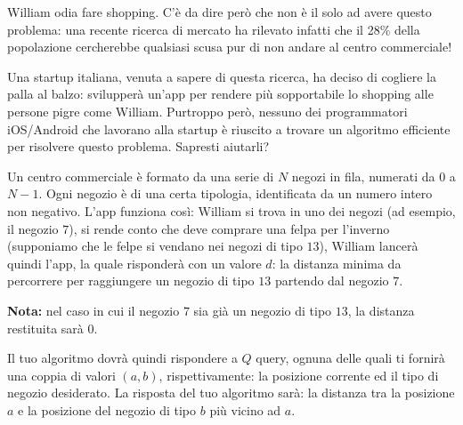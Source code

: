 \usepackage{xcolor}
\usepackage{afterpage}
\usepackage{pifont,mdframed}
\usepackage[bottom]{footmisc}

\makeatletter
\gdef\this@inputfilename{input.txt}
\gdef\this@outputfilename{output.txt}
\makeatother

\newcommand{\inputfile}{\texttt{input.txt}}
\newcommand{\outputfile}{\texttt{output.txt}}

\newenvironment{warning}
  {\par\begin{mdframed}[linewidth=2pt,linecolor=gray]%
    \begin{list}{}{\leftmargin=1cm
                   \labelwidth=\leftmargin}\item[\Large\ding{43}]}
  {\end{list}\end{mdframed}\par}

William odia fare shopping. C'è da dire però che non è il solo ad avere questo problema: una recente ricerca di mercato ha rilevato infatti che il 28\% della popolazione cercherebbe qualsiasi scusa pur di non andare al centro commerciale!

Una startup italiana, venuta a sapere di questa ricerca, ha deciso di cogliere la palla al balzo: svilupperà un'app per rendere più sopportabile lo shopping alle persone pigre come William. Purtroppo però, nessuno dei programmatori iOS/Android che lavorano alla startup è riuscito a trovare un algoritmo efficiente per risolvere questo problema. Sapresti aiutarli?

Un centro commerciale è formato da una serie di $N$ negozi in fila, numerati da $0$ a $N-1$. Ogni negozio è di una certa tipologia, identificata da un numero intero non negativo. L'app funziona così: William si trova in uno dei negozi (ad esempio, il negozio $7$), si rende conto che deve comprare una felpa per l'inverno (supponiamo che le felpe si vendano nei negozi di tipo $13$), William lancerà quindi l'app, la quale risponderà con un valore $d$: la distanza minima da percorrere per raggiungere un negozio di tipo $13$ partendo dal negozio $7$.

\textbf{Nota:} nel caso in cui il negozio $7$ sia già un negozio di tipo $13$, la distanza restituita sarà $0$.

Il tuo algoritmo dovrà quindi rispondere a $Q$ query, ognuna delle quali ti fornirà una coppia di valori $(a, b)$, rispettivamente: la posizione corrente ed il tipo di negozio desiderato. La risposta del tuo algoritmo sarà: la distanza tra la posizione $a$ e la posizione del negozio di tipo $b$ più vicino ad $a$.

